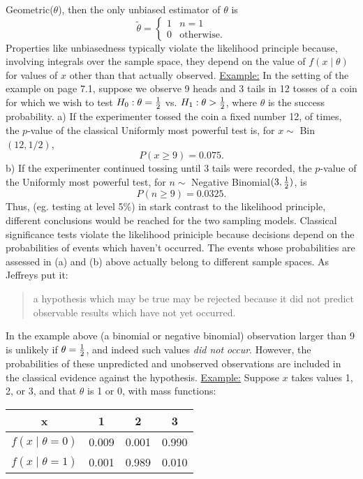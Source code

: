 Geometric($\theta$), then the only unbiased estimator of $\theta$ is 
$$\tilde{\theta}=\left\{ \begin{array}{cc} 1 & n=1 \\ 0 & \mbox{otherwise}.
  \end{array} \right.$$
Properties like unbiasedness typically violate the likelihood
principle because, involving integrals over the sample space, they
depend on the value of $f(x\mid \theta)$ for values of $x$ other than
that actually observed.
\vskip 4mm
\ni\underline{Example:}  In the setting of the example on page 7.1, suppose we
observe 9 heads and 3 tails in 12 tosses of a coin for which we wish
to test $H_0: \theta = {1\over 2}$ vs. $H_1: \theta > {1\over 2}$,
where $\theta$ is the success probability.
\vskip 4mm
\ni a) If the experimenter tossed the coin a fixed number 12, of times,
the $p$-value of the classical Uniformly most powerful test is, for $x\sim$ Bin$(12, 1/2)$,
$$P(x \geq 9) = 0.075.$$
b) If the experimenter continued tossing until 3 tails were recorded,
the $p$-value of the Uniformly most powerful test, for $n\sim$ Negative Binomial$(3,{1\over 2})$, is
$$ P(n\ge 9) =0.0325.$$
\vskip 4mm
Thus, (eg. testing at level 5\%) in stark contrast to the likelihood
principle, different conclusions would be reached for the two sampling
models.
\vskip 4mm
Classical significance tests violate the likelihood priniciple because
decisions depend on the probabilities of events which haven't
occurred.  The events whose probabilities are assessed in (a) and (b)
above actually belong to different sample spaces.
\vskip 4mm
As Jeffreys put it: 
\begin{quote}a hypothesis which may be true may be rejected
because it did not predict observable results which have not yet
occurred.
\end{quote}
  In the example above (a binomial or negative binomial)
observation larger than 9 is unlikely if $\theta={1\over 2}$, and
indeed such values {\it did not occur}.  However, the probabilities of
these unpredicted and unobserved observations are included in the
classical evidence against the hypothesis.
\vskip 4mm
\ni\underline{Example:}  Suppose $x$ takes values 1, 2, or 3, and that
$\theta$ is 1 or 0, with mass functions:
\begin{center}
\begin{tabular}{|c|c|c|c|} \hline
x & 1 & 2 & 3 \\ \hline
$f(x \mid \theta =0)$ & 0.009 & 0.001 & 0.990 \\ \hline
$f(x \mid \theta =1)$ & 0.001 & 0.989 & 0.010 \\ \hline
\end{tabular}
\end{center}
